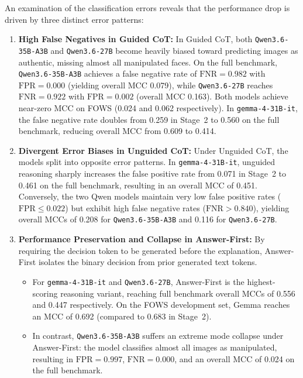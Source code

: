 An examination of the classification errors reveals that the performance drop is driven by three distinct error patterns:

\begin{enumerate}
    \item \textbf{High False Negatives in Guided CoT:}
    In Guided CoT, both \texttt{Qwen3.6-35B-A3B} and \texttt{Qwen3.6-27B} become heavily biased toward predicting images as authentic, missing almost all manipulated faces. On the full benchmark, \texttt{Qwen3.6-35B-A3B} achieves a false negative rate of $\text{FNR} = \num{0.982}$ with $\text{FPR} = \num{0.000}$ (yielding overall MCC \num{0.079}), while \texttt{Qwen3.6-27B} reaches $\text{FNR} = \num{0.922}$ with $\text{FPR} = \num{0.002}$ (overall MCC \num{0.163}). Both models achieve near-zero MCC on FOWS (\num{0.024} and \num{0.062} respectively). In \texttt{gemma-4-31B-it}, the false negative rate doubles from \num{0.259} in Stage~2 to \num{0.560} on the full benchmark, reducing overall MCC from \num{0.609} to \num{0.414}.

    \item \textbf{Divergent Error Biases in Unguided CoT:}
    Under Unguided CoT, the models split into opposite error patterns. In \texttt{gemma-4-31B-it}, unguided reasoning sharply increases the false positive rate from \num{0.071} in Stage~2 to \num{0.461} on the full benchmark, resulting in an overall MCC of \num{0.451}. Conversely, the two Qwen models maintain very low false positive rates ($\text{FPR} \le \num{0.022}$) but exhibit high false negative rates ($\text{FNR} > \num{0.840}$), yielding overall MCCs of \num{0.208} for \texttt{Qwen3.6-35B-A3B} and \num{0.116} for \texttt{Qwen3.6-27B}.

    \item \textbf{Performance Preservation and Collapse in Answer-First:}
    By requiring the decision token to be generated before the explanation, Answer-First isolates the binary decision from prior generated text tokens.
    \begin{itemize}
        \item For \texttt{gemma-4-31B-it} and \texttt{Qwen3.6-27B}, Answer-First is the highest-scoring reasoning variant, reaching full benchmark overall MCCs of \num{0.556} and \num{0.447} respectively. On the FOWS development set, Gemma reaches an MCC of \num{0.692} (compared to \num{0.683} in Stage~2).
        \item In contrast, \texttt{Qwen3.6-35B-A3B} suffers an extreme mode collapse under Answer-First: the model classifies almost all images as manipulated, resulting in $\text{FPR} = \num{0.997}$, $\text{FNR} = \num{0.000}$, and an overall MCC of \num{0.024} on the full benchmark.
    \end{itemize}
\end{enumerate}

